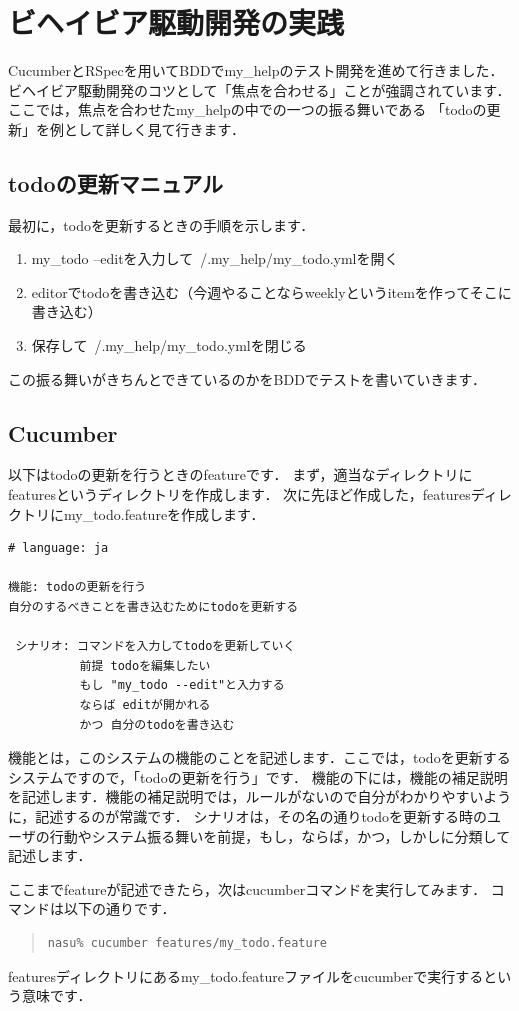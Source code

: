 
\section{ビヘイビア駆動開発の実践}
CucumberとRSpecを用いてBDDでmy\_helpのテスト開発を進めて行きました．
ビヘイビア駆動開発のコツとして「焦点を合わせる」ことが強調されています．
ここでは，焦点を合わせたmy\_helpの中での一つの振る舞いである
「todoの更新」を例として詳しく見て行きます．

\subsection{todoの更新マニュアル}
最初に，todoを更新するときの手順を示します．

\begin{enumerate}
\item my\_todo --editを入力して~/.my\_help/my\_todo.ymlを開く
\item editorでtodoを書き込む（今週やることならweeklyというitemを作ってそこに書き込む）
\item 保存して~/.my\_help/my\_todo.ymlを閉じる
\end{enumerate}
この振る舞いがきちんとできているのかをBDDでテストを書いていきます．

\subsection{Cucumber}
以下はtodoの更新を行うときのfeatureです．
まず，適当なディレクトリにfeaturesというディレクトリを作成します．
次に先ほど作成した，featuresディレクトリにmy\_todo.featureを作成します．
\begin{lstlisting}[style=customCsh]
# language: ja 

機能: todoの更新を行う
自分のするべきことを書き込むためにtodoを更新する

 シナリオ: コマンドを入力してtodoを更新していく
          前提 todoを編集したい
          もし "my_todo --edit"と入力する
          ならば editが開かれる
          かつ 自分のtodoを書き込む
\end{lstlisting}
機能とは，このシステムの機能のことを記述します．ここでは，todoを更新するシステムですので，「todoの更新を行う」です．
機能の下には，機能の補足説明を記述します．機能の補足説明では，ルールがないので自分がわかりやすいように，記述するのが常識です．
シナリオは，その名の通りtodoを更新する時のユーザの行動やシステム振る舞いを前提，もし，ならば，かつ，しかしに分類して記述します．

ここまでfeatureが記述できたら，次はcucumberコマンドを実行してみます．
コマンドは以下の通りです．
\begin{quote}\begin{verbatim}
nasu% cucumber features/my_todo.feature
\end{verbatim}\end{quote}
featuresディレクトリにあるmy\_todo.featureファイルをcucumberで実行するという意味です．

